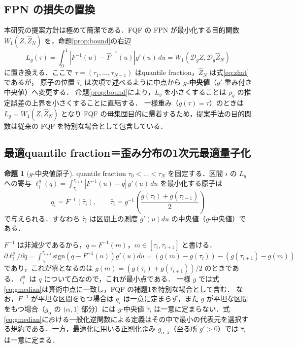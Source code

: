 \documentclass[a4paper,10pt]{jsarticle}
\makeatletter
\theoremstyle{definition}
\newtheorem{proposition}{命題}[section]
\renewenvironment{proof}[1][\proofname]{\par
  \pushQED{\qed}%
  \normalfont \topsep6\p@\@plus6\p@\relax
  \trivlist
  \item[\hskip\labelsep\textbf{#1}]\ignorespaces
}{%
  \popQED\endtrivlist\@endpefalse
}
\renewcommand{\proofname}{証明}
\newcommand{\Wone}{W_1}
\newcommand{\Finv}{F^{-1}}
\newcommand{\Fhinv}{\hat{F}^{-1}}
\newcommand{\dist}{\mathcal{D}_g}
\makeatother
\begin{document}
\subsection{FPN の損失の置換}
本研究の提案方針は極めて簡潔である．FQF の FPN が最小化する目的関数
$\Wone(Z,\hat Z_N)$ を，命題\ref{prop:bound}の右辺
\begin{equation}
  L_g(\tau)=\int_0^1\left|\Finv(u)-\Fhinv(u)\right|g'(u)\,du=\Wone(\dist Z,\dist\hat Z_N)
  \label{eq:Lg}
\end{equation}
に置き換える．ここで $\tau=(\tau_1,\dots,\tau_{N-1})$ はquantile fraction，$\hat Z_N$ は式\eqref{eq:zhat}であるが，
原子の位置 $\hat\tau_i$ は次項で述べるように中点から \textbf{$g$-中央値}（$g'$-重み付き中央値）へ変更する．
命題\ref{prop:bound}により，$L_g$ を小さくすることは $\rho_g$ の推定誤差の上界を小さくすることに直結する．
一様重み（$g(\tau)=\tau$）のときは $L_g=\Wone(Z,\hat Z_N)$ となり FQF の母集団目的に帰着するため，提案手法の目的関数は従来の FQF を特別な場合として包含している．

\subsection{最適quantile fraction＝歪み分布の1次元最適量子化}
\begin{proposition}[$g$-中央値原子]
\label{prop:gmedian}
quantile fraction $\tau_0<\dots<\tau_N$ を固定する．区間 $i$ の $L_g$ への寄与
$\ell^g_i(q)=\int_{\tau_i}^{\tau_{i+1}}|\Finv(u)-q|\,g'(u)\,du$ を最小化する原子は
\begin{equation}
  q_i=\Finv(\hat\tau_i),\qquad \hat\tau_i=g^{-1}\!\left(\frac{g(\tau_i)+g(\tau_{i+1})}{2}\right)
  \label{eq:gmedian}
\end{equation}
で与えられる．すなわち $\hat\tau_i$ は区間上の測度 $g'(u)du$ の中央値（$g$-中央値）である．
\end{proposition}
\begin{proof}
$\Finv$ は非減少であるから，$q=\Finv(m)$，$m\in[\tau_i,\tau_{i+1}]$ と書ける．
$\partial\ell_i^g/\partial q=\int_{\tau_i}^{\tau_{i+1}}\mathrm{sign}(q-\Finv(u))g'(u)du
=\left(g(m)-g(\tau_i)\right)-\left(g(\tau_{i+1})-g(m)\right)$ であり，これが零となるのは
$g(m)=(g(\tau_i)+g(\tau_{i+1}))/2$ のときである．$\ell^g_i$ は $q$ について凸なので，これが最小点である．
\end{proof}
一様 $g$ では式\eqref{eq:gmedian}は算術中点に一致し，FQF の補題1を特別な場合として含む．
なお，$\Finv$ が平坦な区間をもつ場合は $q_i$ は一意に定まらず，また $g$ が平坦な区間をもつ場合（$g_\alpha$ の $(\alpha,1]$ 部分）には $g$-中央値 $\hat\tau_i$ は一意に定まらない．式\eqref{eq:gmedian}における一般化逆関数による定義はその中で最小の代表元を選択する規約である．一方，最適化に用いる正則化歪み $g_{\alpha,\lambda}$（至る所 $g'>0$）では $\hat\tau_i$ は一意に定まる．
\end{document}
